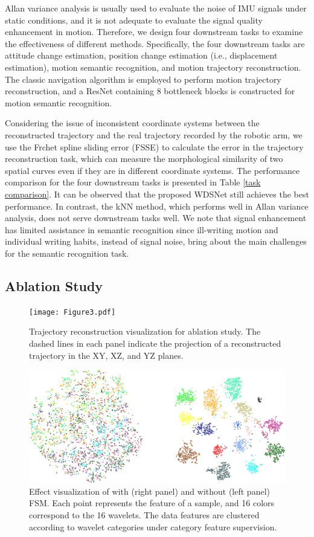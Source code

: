 \documentclass[letterpaper]{article}
\begin{document}
Allan variance analysis is usually used to evaluate the noise of IMU signals under static conditions, and it is not adequate to evaluate the signal quality enhancement in motion. Therefore, we design four downstream tasks to examine the effectiveness of different methods. Specifically, the four downstream tasks are attitude change estimation, position change estimation (i.e., displacement estimation), motion semantic recognition, and motion trajectory reconstruction. The classic navigation algorithm is employed to perform motion trajectory reconstruction, and a ResNet containing 8 bottleneck blocks is constructed for motion semantic recognition.


Considering the issue of inconsistent coordinate systems between the reconstructed trajectory and the real trajectory recorded by the robotic arm, we use the Frchet spline sliding error (FSSE) \cite{10080916} to calculate the error in the trajectory reconstruction task, which can measure the morphological similarity of two spatial curves even if they are in different coordinate systems.
The performance comparison for the four downstream tasks is presented in Table \ref{task comparison}.
It can be observed that the proposed WDSNet still achieves the best performance. In contrast, the kNN method, which performs well in Allan variance analysis, does not serve downstream tasks well. We note that signal enhancement has limited assistance in semantic recognition since ill-writing motion and individual writing habits, instead of signal noise, bring about the main challenges for the semantic recognition task.






\subsection{Ablation Study}
\begin{figure}[!h]
\centering
\texttt{[image: Figure3.pdf]}
\caption{Trajectory reconstruction visualization for ablation study. The dashed lines in each panel indicate the projection of a reconstructed trajectory in the XY, XZ, and YZ planes.}
\label{Trajectory}
\end{figure}
\begin{figure}[htbp]
\centering
\includegraphics[width=1.00\linewidth]{Figure4.pdf}
\caption{Effect visualization of with (right panel) and without (left panel) FSM. Each point represents the feature of a sample, and 16 colors correspond to the 16 wavelets. The data features are clustered according to wavelet categories under category feature supervision.}
\label{FSM ablation}
\end{figure}
\end{document}
